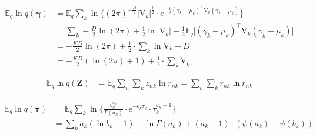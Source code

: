 \documentclass[twoside,11pt]{article}
\newcommand{\transpose}[1]{#1^{\intercal}}
\newcommand{\nsum}{\sum\limits_{n}}
\newcommand{\ksum}{\sum\limits_{k}}
\newcommand{\boldgamma}{\boldsymbol\gamma}
\newcommand{\boldtau}{\boldsymbol\tau}
\newcommand{\E}{\mathbb{E}}
\begin{document}
\begin{align*}
	\E_q \ln q\left( \boldgamma \right) &= \E_q \ksum \ln \Big\{ (2\pi)^{-\frac{D}{2}} |\mathrm{V}_k|^{\frac{1}{2}} \cdot e^{-\frac{1}{2} \transpose{(\gamma_k	- \mu_k)} \mathrm{V}_k (\gamma_k - \mu_k)}\Big\}\\
	&= \ksum -\frac{D}{2} \ln (2\pi) + \frac{1}{2} \ln |\mathrm{V}_k|  -\frac{1}{2} \E_q \Big[ \transpose{(\gamma_k - \mu_k)} \mathrm{V}_k (\gamma_k- \mu_k)\Big] \\
	&= -\frac{KD}{2} \ln (2\pi) + \frac{1}{2} \cdot \ksum \ln \mathrm{V}_k - D \\
	&= - \frac{KD}{2} \left( \ln(2\pi) + 1 \right) + \frac{1}{2} \cdot \ksum \mathrm{V}_k
\end{align*}

\begin{align*}
	\E_q \ln q\left( \mathbf{Z} \right) &= \E_q \nsum \ksum z_{nk} \ln r_{nk} = \nsum \ksum r_{nk} \ln r_{nk}
\end{align*}

\begin{align*}
	\E_q \ln q\left( \boldtau \right) &= \E_q \ksum \ln \Bigg\{ \frac{b_k^{a_k}}{\Gamma(a_k)} \cdot  e^{-b_k \tau_k} \cdot  \tau_k^{a_k - 1}\Bigg\}\\
	&= \ksum a_k \left( \ln b_k - 1 \right) - \ln \Gamma(a_k)  + (a_k - 1) \cdot \left( \psi(a_k) - \psi(b_k) \right)
\end{align*}



\vskip 0.2in
\printbibliography
\end{document}
